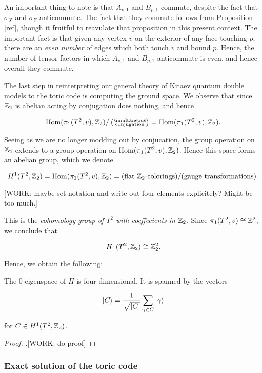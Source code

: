 An important thing to note is that $A_{v,1}$ and $B_{p,1}$ commute, despite the fact that $\sigma_X$ and $\sigma_Z$ anticommute. The fact that they commute follows from Proposition [ref], though it fruitful to reavulate that proposition in this present context. The important fact is that given any vertex $v$ on the exterior of any face touching $p$,  there are an \textit{even number} of edges which both touch $v$ and bound $p$. Hence, the number of tensor factors in which $A_{v,1}$ and $B_{p,1}$ anticommute is even, and hence overall they commute.

The last step in reinterpreting our general theory of Kitaev quantum double models to the toric code is computing the ground space. We observe that since $\mathbb{Z}_2$ is abelian acting by conjugation does nothing, and hence

$$\operatorname{Hom}(\pi_1(T^2,v), \mathbb{Z}_2)/\left(\substack{\text{simultaneous} \\ \text{conjugation}}\right)=\operatorname{Hom}(\pi_1(T^2,v), \mathbb{Z}_2).$$

Seeing as we are no longer modding out by conjucation, the group operation on $\mathbb{Z}_2$ extends to a group operation on $\operatorname{Hom}(\pi_1(T^2,v), \mathbb{Z}_2)$. Hence this space forms an abelian group, which we denote

$$H^1(T^2,\mathbb{Z}_2)=\operatorname{Hom}(\pi_1(T^2,v), \mathbb{Z}_2)=(\text{flat $\mathbb{Z}_2$-colorings})/(\text{gauge transformations}).$$

[WORK: maybe set notation and write out four elements explicitely? Might be too much.]

This is the \textit{cohomology group of $T^2$ with coeffecients in $\mathbb{Z}_2$}. Since $\pi_1(T^2,v)\cong \mathbb{Z}^2$, we conclude that

$$H^1(T^2,\mathbb{Z}_2)\cong \mathbb{Z}_2^2.$$

Hence, we obtain the following:

\begin{proposition} The $0$-eigenspace of $H$ is four dimensional. It is spanned by the vectors

$$\ket{C}=\frac{1}{\sqrt{|C|}}\sum_{\gamma\in C}\ket{\gamma}$$

for $C\in H^1(T^2,\mathbb{Z}_2)$.
\end{proposition}
\begin{proof}.[WORK: do proof]
\end{proof}

\subsubsection{Exact solution of the toric code}

